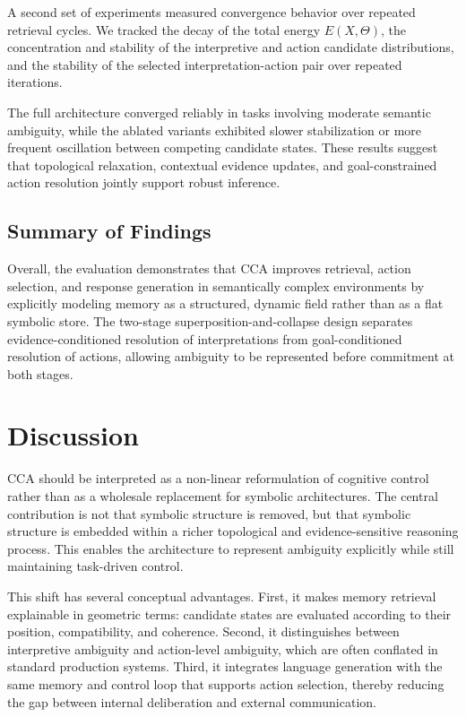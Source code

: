 \documentclass[10pt,journal,compsoc]{IEEEtran}
\begin{document}
A second set of experiments measured convergence behavior over repeated retrieval cycles. We tracked the decay of the total energy $E(X,\Theta)$, the concentration and stability of the interpretive and action candidate distributions, and the stability of the selected interpretation-action pair over repeated iterations.

The full architecture converged reliably in tasks involving moderate semantic ambiguity, while the ablated variants exhibited slower stabilization or more frequent oscillation between competing candidate states. These results suggest that topological relaxation, contextual evidence updates, and goal-constrained action resolution jointly support robust inference.

\subsection{Summary of Findings}

Overall, the evaluation demonstrates that CCA improves retrieval, action selection, and response generation in semantically complex environments by explicitly modeling memory as a structured, dynamic field rather than as a flat symbolic store. The two-stage superposition-and-collapse design separates evidence-conditioned resolution of interpretations from goal-conditioned resolution of actions, allowing ambiguity to be represented before commitment at both stages.

\section{Discussion}

CCA should be interpreted as a non-linear reformulation of cognitive control rather than as a wholesale replacement for symbolic architectures. The central contribution is not that symbolic structure is removed, but that symbolic structure is embedded within a richer topological and evidence-sensitive reasoning process. This enables the architecture to represent ambiguity explicitly while still maintaining task-driven control.

This shift has several conceptual advantages. First, it makes memory retrieval explainable in geometric terms: candidate states are evaluated according to their position, compatibility, and coherence. Second, it distinguishes between interpretive ambiguity and action-level ambiguity, which are often conflated in standard production systems. Third, it integrates language generation with the same memory and control loop that supports action selection, thereby reducing the gap between internal deliberation and external communication.
\end{document}
